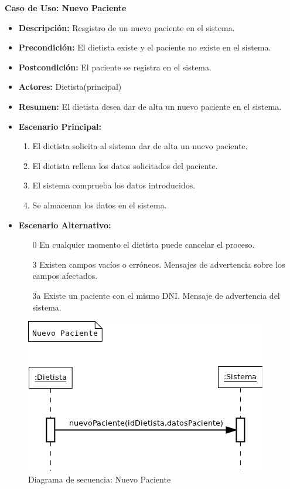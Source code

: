 \textbf{Caso de Uso: Nuevo Paciente}
\begin{itemize}
\item \textbf{Descripción:} Resgistro de un nuevo paciente en el sistema.
\item \textbf{Precondición:} El dietista existe y el paciente no existe en el sistema.
\item \textbf{Postcondición:} El paciente se registra en el sistema.
\item \textbf{Actores:} Dietista(principal)
\item \textbf{Resumen:} El dietista desea dar de alta un nuevo paciente en el sistema.
\item \textbf{Escenario Principal:}
\begin{enumerate}
\item El dietista solicita al sistema dar de alta un nuevo paciente.
\item El dietista rellena los datos solicitados del paciente.
\item El sistema comprueba los datos introducidos.
\item Se almacenan los datos en el sistema.
\end{enumerate}
\item \textbf{Escenario Alternativo:}
\begin{enumerate}
\item[0] En cualquier momento el dietista puede cancelar el proceso.
\item[3] Existen campos vacíos o erróneos. Mensajes de advertencia sobre los campos afectados.
\item[3a] Existe un paciente con el mismo DNI. Mensaje de advertencia del sistema.
\end{enumerate}
\end{itemize}
\begin{figure}[H]
  \label{ds_nuevopaciente}
  \begin{center}
    \includegraphics[scale=0.7]{../img/DS_NuevoPaciente.png}
  \end{center}
  \caption{Diagrama de secuencia: Nuevo Paciente}
\end{figure}
